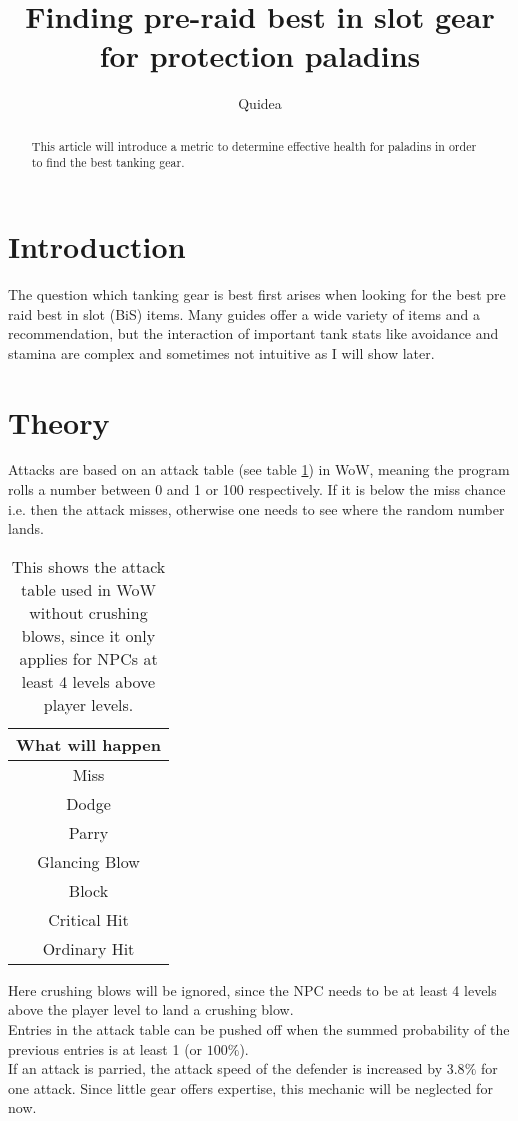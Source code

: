 \documentclass[a4paper,10pt]{article}
\title{Finding pre-raid best in slot gear for protection paladins}
\author{Quidea}
\begin{document}
\maketitle

\begin{abstract}
This article will introduce a metric to determine effective health for paladins in order to find the best tanking gear.
\end{abstract}

\section{Introduction}
The question which tanking gear is best first arises when looking for the best pre raid best in slot (BiS) items. Many guides offer a wide variety of items and a recommendation, but the interaction of important tank stats like avoidance and stamina are complex and sometimes not intuitive as I will show later.  
\section{Theory}
Attacks are based on an attack table (see table \ref{tab_attack_table}) in WoW, meaning the program rolls a number between 0 and 1 or 100 respectively. If it is below the miss chance i.e. then the attack misses, otherwise one needs to see where the random number lands. 

\begin{table}
\centering
 \begin{tabular}{|c|}
 What will happen\\
 \hline
  Miss\\
  Dodge\\
  Parry\\
  Glancing Blow \\
  Block\\
  Critical Hit\\
  Ordinary Hit
 \end{tabular}
\caption{This shows the attack table used in WoW without crushing blows, since it only applies for NPCs at least 4 levels above player levels.}
\label{tab_attack_table}
\end{table}
Here crushing blows will be ignored, since the NPC needs to be at least 4 levels above the player level to land a crushing blow. \\
Entries in the attack table can be pushed off when the summed probability of the previous entries is at least 1 (or $100\%$).\\
If an attack is parried, the attack speed of the defender is increased by $3.8\%$ for one attack. Since little gear offers expertise, this mechanic will be neglected for now. 
\end{document}
